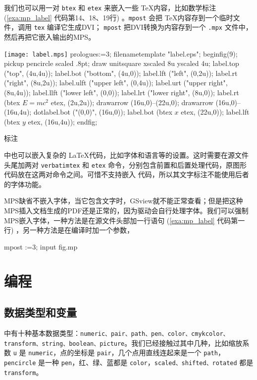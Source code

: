 我们也可以用一对 \texttt{btex} 和 \texttt{etex} 来嵌入一些 \TeX 内容，比如数学标注 (\autoref{exa:mp_label} 代码第14、18、19行) 。\texttt{mpost} 会把 \TeX 内容存到一个临时文件，调用 \texttt{tex} 编译它生成DVI； \texttt{mpost} 把DVI转换为\MP 内容存到一个 \texttt{.mpx} 文件中，然后再把它嵌入输出的MPS。

\begin{example}[h]
\begin{FBTDemo}[numbers=left]{\texttt{[image: label.mps]}}
prologues:=3;
filenametemplate "label.eps";
beginfig(9);
pickup pencircle scaled .8pt;
draw unitsquare xscaled 8u yscaled 4u;
label.top ("top", (4u,4u));
label.bot ("bottom", (4u,0));
label.lft ("left", (0,2u));
label.rt ("right", (8u,2u));
label.ulft ("upper left", (0,4u));
label.urt ("upper right", (8u,4u));
label.llft ("lower left", (0,0));
label.lrt ("lower right", (8u,0));
label.rt (btex $E=mc^2$ etex, (2u,2u));
drawarrow (16u,0)--(22u,0);
drawarrow (16u,0)--(16u,4u);
dotlabel.bot ("(0,0)", (16u,0));
label.bot (btex $x$ etex, (22u,0));
label.lft (btex $y$ etex, (16u,4u));
endfig;
\end{FBTDemo}
\caption{\MP 标注}
\label{exa:mp_label}
\end{example}

\MP 中也可以嵌入复杂的 \LaTeX 代码，比如字体和语言等的设置。这时需要在源文件头尾加两对 \texttt{verbatimtex} 和 \texttt{etex} 命令，分别包含前置和后置处理代码，原图形代码放在这两对命令之间。可惜\MP 不支持嵌入 \XeLaTeX 代码，所以其文字标注不能使用后者的字体功能。

MPS缺省不嵌入字体，当它包含文字时，GSview就不能正常查看；但是把这种MPS插入文档生成的PDF还是正常的，因为驱动会自行处理字体。我们可以强制MPS嵌入字体，一种方法是在源文件头部加一行语句 (\autoref{exa:mp_label} 代码第一行) ，另一种方法是在编译时加一个参数，

\begin{Code}[]
mpost \prologues:=3; input fig.mp
\end{Code}

\section{编程}
\subsection{数据类型和变量}

\MP 中有十种基本数据类型：\texttt{numeric、pair、path、pen、color、cmykcolor、transform、string、boolean、picture}。我们已经接触过其中几种，比如缩放系数 \texttt{u} 是 \texttt{numeric}，点的坐标是 \texttt{pair}，几个点用直线连起来是一个 \texttt{path}，\texttt{pencircle} 是一种 \texttt{pen}，红、绿、蓝都是 \texttt{color}，\texttt{scaled、shifted、rotated} 都是 \texttt{transform}。

